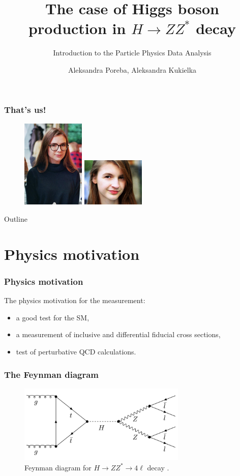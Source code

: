 \documentclass[aspectratio=1610, english]{beamer}
\author[Aleksandra Poreba, Aleksandra Kukielka]{Aleksandra Poreba, Aleksandra Kukielka}
\date{}
\title[The $H \rightarrow ZZ^{*}$ decay analysis]{The case of Higgs boson production in $H \rightarrow ZZ^{*}$ decay}
\subtitle{Introduction to the Particle Physics Data Analysis}
\newcommand{\hzz}{ H\rightarrow ZZ^{*}\rightarrow 4 \ell}
\begin{document}
\maketitle

\begin{frame}
\frametitle{That's us!}

\begin{figure} [H]
\centering
\includegraphics[width=3cm]{zdj1.png}
\includegraphics[width=3cm]{zdj2.png}
\end{figure}

\end{frame}

\begin{frame}{Outline}
	\tableofcontents
\end{frame}

\section{Physics motivation}

\begin{frame}
\frametitle{Physics motivation}
The physics motivation for the measurement:
\begin{itemize}
\item a good test for the SM,
\item a measurement of inclusive and differential fiducial cross sections,
\item test of perturbative QCD calculations.
\end{itemize}

\end{frame}

\begin{frame}
\frametitle{The Feynman diagram}

\begin{figure} [H]
\centering
\includegraphics[width=8cm]{feynman_diagram.png}
\caption{Feynman diagram for $\hzz$ decay \cite{diagram}. }
\end{figure}

\end{frame}
\end{document}
